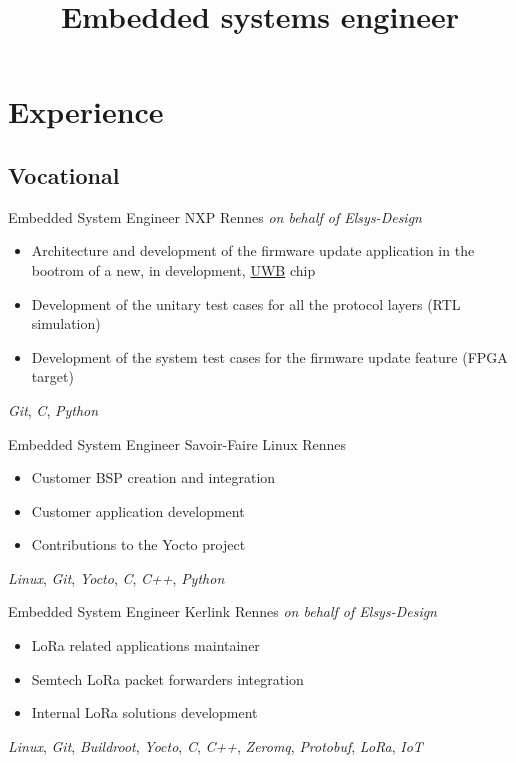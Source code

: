 \documentclass[11pt,a4paper,sans]{moderncv}
\title{Embedded systems engineer}
\begin{document}
\makecvtitle

\section{Experience}
\subsection{Vocational}
	{Embedded System Engineer}
	{NXP}
	{Rennes}
	{\textit{on behalf of Elsys-Design}}
	{
		\begin{itemize}
		\item Architecture and development of the firmware update
			application in the bootrom of a new, in development,
			\href{https://en.wikipedia.org/wiki/Ultra-wideband}{UWB}
			chip
		\item Development of the unitary test cases for all the protocol
			layers (RTL simulation)
		\item Development of the system test cases for the firmware
			update feature (FPGA target)
		\end{itemize}
		\textit{Git},
		\textit{C}, \textit{Python}
	}
	{Embedded System Engineer}
	{Savoir-Faire Linux}
	{Rennes}
	{}
	{
		\begin{itemize}
		\item Customer BSP creation and integration
		\item Customer application development
		\item Contributions to the Yocto project
		\end{itemize}
		\textit{Linux},
		\textit{Git},
		\textit{Yocto},
		\textit{C}, \textit{C++}, \textit{Python}
	}
	{Embedded System Engineer}
	{Kerlink}
	{Rennes}
	{\textit{on behalf of Elsys-Design}}
	{
		\begin{itemize}
		\item LoRa related applications maintainer
		\item Semtech LoRa packet forwarders integration
		\item Internal LoRa solutions development
		\end{itemize}
		\textit{Linux},
		\textit{Git},
		\textit{Buildroot}, \textit{Yocto},
		\textit{C}, \textit{C++},
		\textit{Zeromq}, \textit{Protobuf},
		\textit{LoRa}, \textit{IoT}
	}
\end{document}

